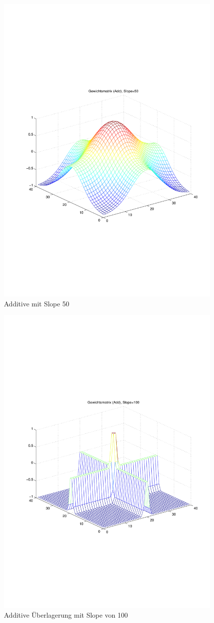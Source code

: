 \begin{figure}[hbt]
\begin{minipage}{0.48\textwidth}
		\includegraphics[trim=70 200 32 242, clip, width=\textwidth]{./Bilder/Auswertung/Gewichtsmatrix/Gewichtsmatrix_Add_Slope_50}
		\caption{Additive mit Slope 50}
		\label{Add50}
	\end{minipage}
\end{figure}
\begin{figure}[hbt]
	\centering
	\includegraphics[trim=70 200 32 242, clip, width=0.48\linewidth]{./Bilder/Auswertung/Gewichtsmatrix/Gewichtsmatrix_Add_Slope_100}
	\caption{Additive Überlagerung mit Slope von 100}
	\label{Add100}
\end{figure}

